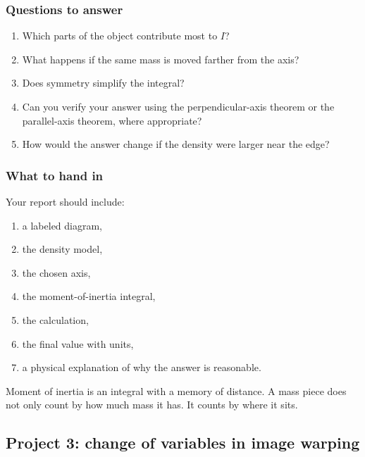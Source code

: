 \subsubsection*{Questions to answer}

\begin{enumerate}
\item Which parts of the object contribute most to \(I\)?

\item What happens if the same mass is moved farther from the axis?

\item Does symmetry simplify the integral?

\item Can you verify your answer using the perpendicular-axis theorem or the
parallel-axis theorem, where appropriate?

\item How would the answer change if the density were larger near the edge?
\end{enumerate}

\subsubsection*{What to hand in}

Your report should include:

\begin{enumerate}
\item a labeled diagram,

\item the density model,

\item the chosen axis,

\item the moment-of-inertia integral,

\item the calculation,

\item the final value with units,

\item a physical explanation of why the answer is reasonable.
\end{enumerate}

Moment of inertia is an integral with a memory of distance.  A mass piece does not
only count by how much mass it has.  It counts by where it sits.

\subsection{Project 3: change of variables in image warping}

